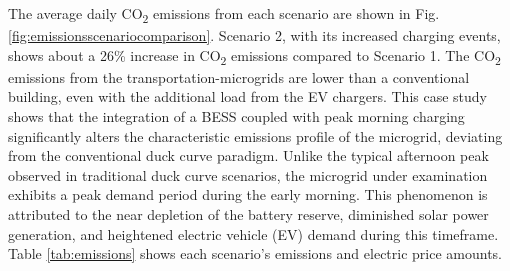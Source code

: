 \documentclass[conference]{IEEEtran}
\begin{document}
	\indent The average daily CO\textsubscript{2} emissions from each scenario are shown in Fig. \ref{fig:emissionsscenariocomparison}. 
Scenario 2, with its increased charging events, shows about a 26\% increase in CO\textsubscript{2} emissions compared to Scenario 1. The CO\textsubscript{2} emissions from the transportation-microgrids are lower than a conventional building, even with the additional load from the EV chargers. This case study shows that the integration of a BESS coupled with peak morning charging significantly alters the characteristic emissions profile of the microgrid, deviating from the conventional duck curve paradigm. Unlike the typical afternoon peak observed in traditional duck curve scenarios, the microgrid under examination exhibits a peak demand period during the early morning. This phenomenon is attributed to the near depletion of the battery reserve, diminished solar power generation, and heightened electric vehicle (EV) demand during this timeframe. Table \ref{tab:emissions} shows each scenario's emissions and electric price amounts.
\end{document}

